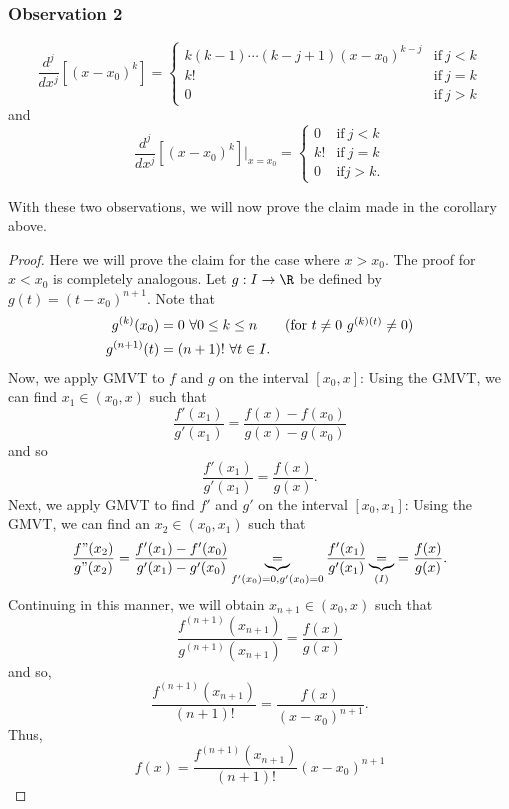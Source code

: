\subsubsection{Observation 2}
\[ \frac{ d^{j} }{  d x^{j} } [(x - {x}_{0})^{k}] = 
\begin{cases}
    k (k-1) \cdots (k - j + 1) (x - {x}_{0})^{k - j} &\text{if} \ j < k \\
    k! &\text{if} \ j = k \\
    0 &\text{if} \ j > k 
\end{cases} \]
and
\[ \frac{ d^{j} }{  d x^{j} } [(x - {x}_{0})^{k}] \Big|_{ x = {x}_{0}} = 
\begin{cases}
    0 &\text{if} \ j < k \\
    k! &\text{if} \ j = k \\
    0 &\text{if} j > k. 
\end{cases} \]

With these two observations, we will now prove the claim made in the corollary above. 

\begin{proof}
Here we will prove the claim for the case where \( x > {x}_{0} \). The proof for \( x < {x}_{0} \) is completely analogous. Let \( g: I \to \R  \) be defined by \( g(t) = (t - {x}_{0})^{n+1} \). Note that 
\begin{align*}
    g^{(k)}({x}_{0}) &= 0 \ \forall 0 \leq k \leq n \tag{for \( t \neq 0  \) \( g^{(k)(t)} \neq 0  \)} \\
    g^{(n+1)}(t) &= (n + 1)! \ \forall t \in I. 
\end{align*}
Now, we apply GMVT to \( f  \) and \( g  \) on the interval \( [{x}_{0},x] \): Using the GMVT, we can find \( {x}_{1} \in ({x}_{0},x) \) such that 
\[  \frac{ f'({x}_{1}) }{ g'({x}_{1}) }  = \frac{ f(x) - f({x}_{0}) }{  g(x) - g({x}_{0}) } \]
and so 
\[  \frac{ f'({x}_{1}) }{ g'({x}_{1}) } = \frac{ f(x) }{ g(x) }. \tag{I} \]
Next, we apply GMVT to find \( f'  \) and \( g'  \) on the interval \( [{x}_{0}, {x}_{1}] \): Using the GMVT, we can find an \( {x}_{2} \in ({x}_{0}, {x}_{1}) \) such that 
\[  \frac{ f"({x}_{2}) }{ g"({x}_{2}) }  = \frac{ f'({x}_{1}) - f'({x}_{0}) }{  g'({x}_{1}) - g'({x}_{0}) } \underbrace{=}_{f'({x}_{0})=0, g'({x}_{0}) = 0} \frac{ f'({x}_{1}) }{  g'({x}_{1}) }  \underbrace{=}_{(I)} = \frac{ f(x) }{ g(x) }.  \]
Continuing in this manner, we will obtain \( {x}_{n+1} \in ({x}_{0}, x)  \) such that 
\[  \frac{ f^{(n+1)}({x}_{n+1}) }{ g^{(n+1)}({x}_{n+1}) }  = \frac{ f(x) }{  g(x) } \]
and so,
\[  \frac{ f^{(n+1)}({x}_{n+1})  }{ (n+1)! }  = \frac{ f(x) }{  (x - {x}_{0})^{n+1} }.  \]
Thus, 
\[  f(x) = \frac{ f^{(n+1)}({x}_{n+1}) }{ (n+1)! } (x - {x}_{0})^{n+1} \]
\end{proof}

